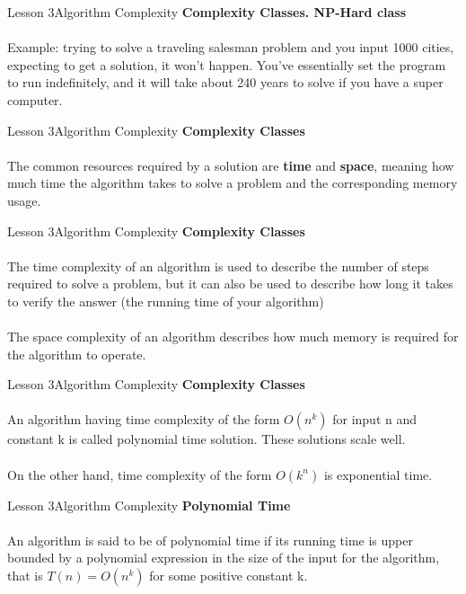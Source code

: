 \documentclass[aspectratio=1610]{beamer}
\begin{document}
\begin{frame}{Lesson 3}{Algorithm Complexity}
\LARGE
\textbf{Complexity Classes. NP-Hard class}\\~\\
\Large
Example: trying to solve a traveling salesman problem and you input 1000 cities,
expecting to get a solution, it won’t happen. You’ve essentially set the program to
run indefinitely, and it will take about 240 years to solve if you have a super
computer.
\end{frame}


\begin{frame}{Lesson 3}{Algorithm Complexity}
\LARGE
\textbf{Complexity Classes}\\~\\
\Large
The common resources required by a solution are \textbf{time} and
\textbf{space}, meaning how much time the algorithm takes to solve 
a problem and the corresponding memory usage.
\end{frame}


\begin{frame}{Lesson 3}{Algorithm Complexity}
\LARGE
\textbf{Complexity Classes}\\~\\
\Large
The \alert{time complexity} of an algorithm is used to describe the 
number of steps required to solve a problem, but it can also be used
to describe how long it takes to verify the answer (the running time
of your algorithm)\\~\\
The \alert{space complexity} of an algorithm describes how much memory is
required for the algorithm to operate. 
\end{frame}


\begin{frame}{Lesson 3}{Algorithm Complexity}
\LARGE
\textbf{Complexity Classes}\\~\\
\Large
An algorithm having time complexity of the form $O(n^k)$ for input n
and constant k is called polynomial time solution. These solutions scale well.
\\~\\
On the other hand, time complexity of the form $O(k^n)$ is exponential time.
\end{frame}



\begin{frame}{Lesson 3}{Algorithm Complexity}
\LARGE
\textbf{Polynomial Time}\\~\\
\Large
An algorithm is said to be of polynomial time if its running time is upper bounded
by a \alert{polynomial} expression in the size of the input for the algorithm,
that is \(T(n) = O(n^k)\) for some positive constant k.
\end{frame}
\end{document}
